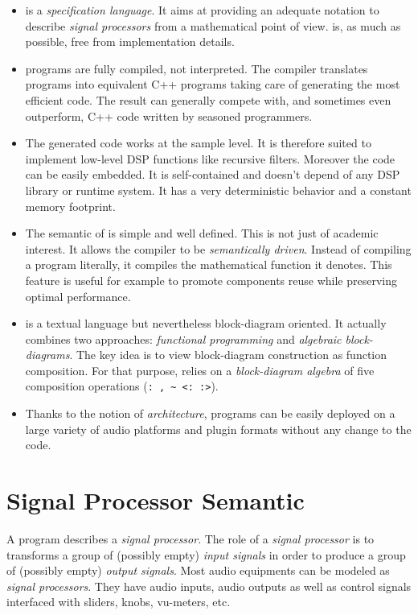 \documentclass[a4paper,10pt]{book}
\begin{document}
\begin{itemize}

\item \faust is a \textit{specification language}. It aims at providing an adequate notation to describe \textit{signal processors} from a mathematical point of view. \faust is, as much as possible, free from implementation details. 

\item \faust programs are fully compiled, not interpreted. The compiler translates \faust programs into equivalent C++ programs taking care of generating the most efficient code. The result can generally compete with, and sometimes even outperform, C++ code written by seasoned programmers. 

\item The generated code works at the sample level. It is therefore suited to implement low-level DSP functions like recursive filters. Moreover the code can be easily embedded. It is self-contained and doesn't depend of any DSP library or runtime system. It has a very deterministic behavior and a constant memory footprint. 

\item The semantic of \faust is simple and well defined. This is not just of academic interest. It allows the \faust compiler to be \emph{semantically driven}. Instead of compiling a program literally, it compiles the mathematical function it denotes. This feature is useful for example to promote components reuse while preserving optimal performance.  

\item \faust is a textual language but nevertheless block-diagram oriented. It actually combines two approaches: \textit{functional programming} and \textit{algebraic block-diagrams}. The key idea is to view block-diagram construction as function composition. For that purpose, \faust relies on a \emph{block-diagram algebra} of five composition operations (\lstinline': , ~ <: :>').

\item Thanks to the notion of \textit{architecture}, \faust programs can be easily deployed on a large variety of audio platforms and plugin formats without any change to the \faust code.

\end{itemize}

\section{Signal Processor Semantic}
A \faust program describes a \emph{signal processor}. 
The role of a \textit{signal processor} is to transforms a group  of (possibly empty) \emph{input signals} in order to produce a group of (possibly empty) \emph{output signals}. 
Most audio equipments can be modeled as \emph{signal processors}. 
They have audio inputs, audio outputs as well as control signals interfaced with sliders, knobs, vu-meters, etc. 
\end{document}

